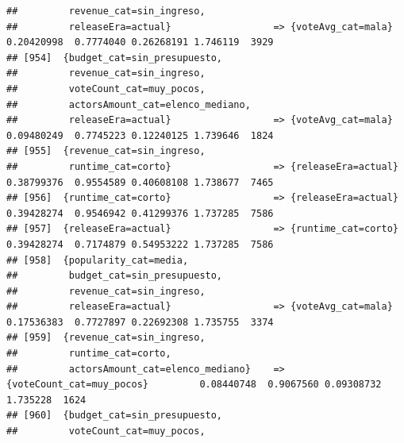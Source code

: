 \documentclass[
]{article}
\begin{document}
\begin{verbatim}
##         revenue_cat=sin_ingreso,                                                                                                
##         releaseEra=actual}                  => {voteAvg_cat=mala}                0.20420998  0.7774040 0.26268191 1.746119  3929
## [954]  {budget_cat=sin_presupuesto,                                                                                             
##         revenue_cat=sin_ingreso,                                                                                                
##         voteCount_cat=muy_pocos,                                                                                                
##         actorsAmount_cat=elenco_mediano,                                                                                        
##         releaseEra=actual}                  => {voteAvg_cat=mala}                0.09480249  0.7745223 0.12240125 1.739646  1824
## [955]  {revenue_cat=sin_ingreso,                                                                                                
##         runtime_cat=corto}                  => {releaseEra=actual}               0.38799376  0.9554589 0.40608108 1.738677  7465
## [956]  {runtime_cat=corto}                  => {releaseEra=actual}               0.39428274  0.9546942 0.41299376 1.737285  7586
## [957]  {releaseEra=actual}                  => {runtime_cat=corto}               0.39428274  0.7174879 0.54953222 1.737285  7586
## [958]  {popularity_cat=media,                                                                                                   
##         budget_cat=sin_presupuesto,                                                                                             
##         revenue_cat=sin_ingreso,                                                                                                
##         releaseEra=actual}                  => {voteAvg_cat=mala}                0.17536383  0.7727897 0.22692308 1.735755  3374
## [959]  {revenue_cat=sin_ingreso,                                                                                                
##         runtime_cat=corto,                                                                                                      
##         actorsAmount_cat=elenco_mediano}    => {voteCount_cat=muy_pocos}         0.08440748  0.9067560 0.09308732 1.735228  1624
## [960]  {budget_cat=sin_presupuesto,                                                                                             
##         voteCount_cat=muy_pocos,                                                                                                

\end{verbatim}
\end{document}
